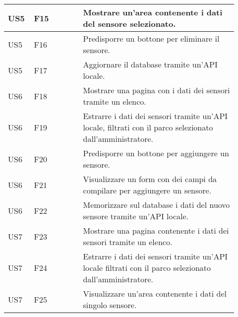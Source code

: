 \begin{table}[ht]
\begin{tabular}{|m{0.09\linewidth}|m{0.2\linewidth}|m{0.63\linewidth}|}
        \hline
        \rowcolor{Gray}
        US5 & F15 & Mostrare un’area contenente i dati del sensore selezionato.\\
        \hline
        US5 & F16 & Predisporre un bottone per eliminare il sensore.\\
        \hline
        \rowcolor{Gray}
        US5 & F17 & Aggiornare il database tramite un’API locale.\\
        \hline
        US6 & F18 & Mostrare una pagina con i dati dei sensori tramite un elenco.\\
        \hline
        \rowcolor{Gray}
        US6 & F19 & Estrarre i dati dei sensori tramite un’API locale, filtrati con il parco selezionato dall’amministratore.\\
        \hline
        US6 & F20 & Predisporre un bottone per aggiungere un sensore.\\
        \hline
        \rowcolor{Gray}
        US6 & F21 & Visualizzare un form con dei campi da compilare per aggiungere un sensore.\\
        \hline 
        US6 & F22 & Memorizzare sul database i dati del nuovo sensore tramite un’API locale.\\
        \hline
        \rowcolor{Gray}
        US7 & F23 & Mostrare una pagina contenente i dati dei sensori tramite un elenco.\\
        \hline
        US7 & F24 & Estrarre i dati dei sensori tramite un’API locale filtrati con il parco selezionato dall’amministratore.\\
        \hline 
        \rowcolor{Gray}
        US7 & F25 & Visualizzare un’area contenente i dati del singolo sensore.\\
        \hline
    \end{tabular}
\end{table}